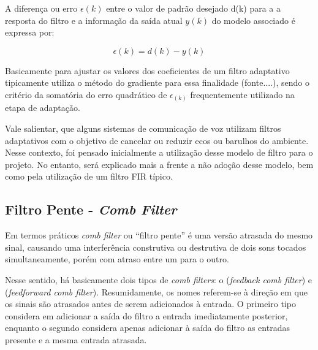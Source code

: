 		A diferença ou erro $\epsilon(k)$ entre o valor de padrão desejado d(k) para a a resposta do filtro e a informação da saída atual $y(k)$ do modelo associado é expressa por:
		
		\begin{equation}
			\label{eq2-filtroadap}
			\epsilon(k) = d(k)- y(k)
		\end{equation}
		
		Basicamente para ajustar os valores dos coeficientes de um filtro adaptativo tipicamente utiliza o método do gradiente para essa finalidade (fonte....), sendo o critério da somatória do erro quadrático de $\epsilon_(k)$ frequentemente utilizado na etapa de adaptação.
		
		Vale salientar, que alguns sistemas de comunicação de voz utilizam filtros adaptativos com o objetivo de cancelar ou reduzir ecos ou barulhos do ambiente. Nesse contexto, foi pensado inicialmente a utilização desse modelo de filtro para o projeto. No entanto, será explicado mais a frente a não adoção desse modelo, bem como pela utilização de um filtro FIR típico.
		
	\subsection{Filtro Pente - \textit{Comb Filter}}
	\label{secao-comb-filter}
		
		Em termos práticos \textit{comb filter} ou “filtro pente” é uma versão atrasada do mesmo sinal, causando uma  interferência construtiva ou destrutiva de dois sons tocados simultaneamente, porém com atraso entre um para o outro. 
		
		Nesse sentido, há basicamente dois tipos de \textit{comb filters}: o (\textit{feedback comb filter}) e (\textit{feedforward comb filter}). Resumidamente, os nomes referem-se à direção em que os sinais são atrasados antes de serem adicionados à entrada. O primeiro tipo considera em adicionar a saída do filtro a entrada imediatamente posterior, enquanto o segundo considera apenas adicionar à saída do filtro as entradas presente e a mesma entrada atrasada.
		
